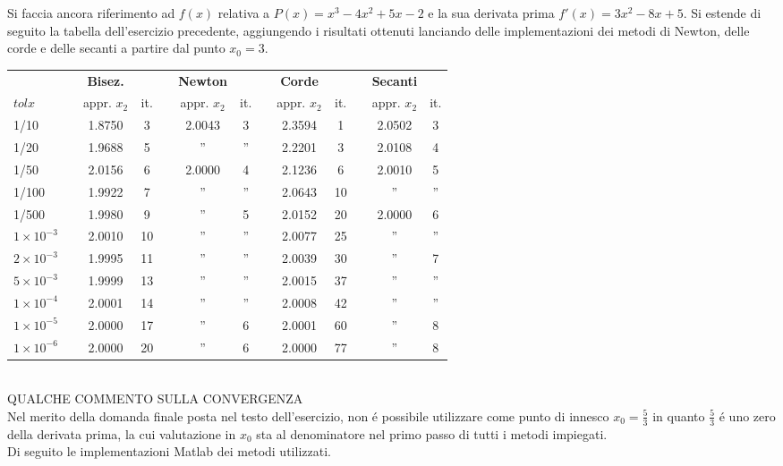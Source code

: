 Si faccia ancora riferimento ad \(f(x)\) relativa a \(P(x)=x^3 - 4x^2 + 5x - 2\) e la sua derivata prima \(f'(x) = 3x^2 - 8x + 5\). Si estende di seguito la tabella dell'esercizio precedente, aggiungendo i risultati ottenuti lanciando delle implementazioni dei metodi di Newton, delle corde e delle secanti a partire dal punto \(x_0 = 3\).

\begin{tabular}{l*{12}{c}}
 & \vline& \textbf{Bisez.} & & \vline& \textbf{Newton} & & \vline& \textbf{Corde} & & \vline& \textbf{Secanti} \\
 \(tolx\) & \vline& appr. \(x_2\) & it. & \vline& appr. \(x_2\) & it.& \vline& appr. \(x_2\) & it.& \vline& appr. \(x_2\) & it.\\
\hline
 1/10 & \vline& 1.8750 & 3 & \vline& 2.0043 & 3 & \vline& 2.3594 & 1 & \vline& 2.0502 & 3\\
 1/20 & \vline& 1.9688 & 5 & \vline& '' & ''& \vline& 2.2201 & 3 & \vline& 2.0108 & 4\\
 1/50 & \vline& 2.0156 & 6 & \vline& 2.0000 & 4 & \vline& 2.1236 & 6 & \vline& 2.0010 & 5\\
 1/100 & \vline& 1.9922 & 7 & \vline& '' &'' & \vline& 2.0643 & 10 & \vline& '' & ''\\
 1/500 & \vline& 1.9980 & 9 & \vline& '' & 5 & \vline& 2.0152 & 20 & \vline& 2.0000 & 6\\
 \(1 \times 10^{-3}\) & \vline& 2.0010 & 10 & \vline& '' & '' & \vline& 2.0077 & 25 & \vline& '' & ''\\
 \(2 \times 10^{-3}\) & \vline& 1.9995 & 11 & \vline& '' & '' & \vline& 2.0039 & 30 & \vline& '' & 7\\
 \(5 \times 10^{-3}\) & \vline& 1.9999 & 13 & \vline& '' & '' & \vline& 2.0015 & 37 & \vline& '' & ''\\
 \(1 \times 10^{-4}\) & \vline& 2.0001 & 14 & \vline& '' & '' & \vline& 2.0008 & 42 & \vline& '' & ''\\
 \(1 \times 10^{-5}\) & \vline& 2.0000 & 17 & \vline& '' & 6  & \vline& 2.0001 & 60 & \vline& '' & 8\\
 \(1 \times 10^{-6}\) & \vline& 2.0000 & 20 & \vline& '' & 6  & \vline& 2.0000 & 77 & \vline& '' & 8\\
\end{tabular} \\

\noindent QUALCHE COMMENTO SULLA CONVERGENZA\\

\noindent Nel merito della domanda finale posta nel testo dell'esercizio, non \'e possibile utilizzare come punto di innesco \(x_0=\frac{5}{3}\) in quanto \(\frac{5}{3}\) \'e uno zero della derivata prima, la cui valutazione in \(x_0\) sta al denominatore nel primo passo di tutti i metodi impiegati.\\

\noindent Di seguito le implementazioni Matlab dei metodi utilizzati.


